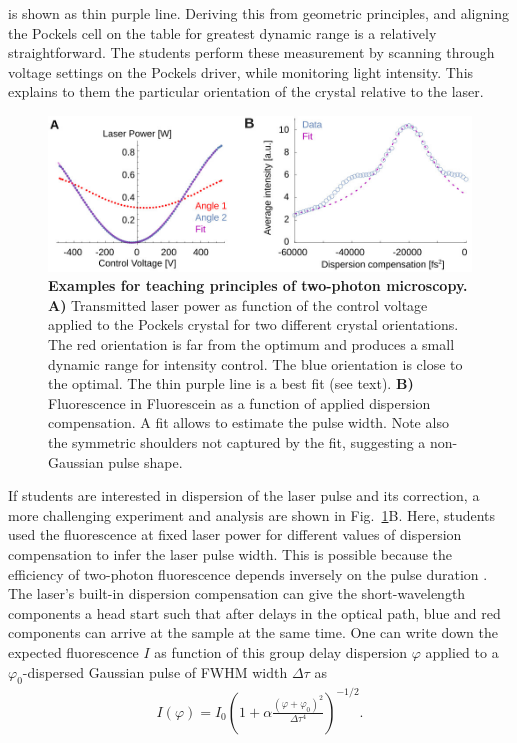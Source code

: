 \documentclass[10pt,letterpaper]{article}
\begin{document}
is shown as thin purple line. Deriving this from geometric principles, and aligning the Pockels cell on the table for greatest dynamic range is a relatively straightforward. The students perform these measurement by scanning through voltage settings on the Pockels driver, while monitoring light intensity. This explains to them the particular orientation of the crystal relative to the laser.\newline
%
\begin{figure}[!t]
    \includegraphics[width=\textwidth]{fig9.jpg}
    \caption{{\bf Examples for teaching principles of two-photon microscopy.} \textbf{A)} Transmitted laser power as function of the control voltage applied to the Pockels crystal for two different crystal orientations. The red orientation is far from the optimum and produces a small dynamic range for intensity control. The blue orientation is close to the optimal. The thin purple line is a best fit (see text). \textbf{B)} Fluorescence in Fluorescein as a function of applied dispersion compensation. A fit allows to estimate the pulse width. Note also the symmetric shoulders not captured by the fit, suggesting a non-Gaussian pulse shape.}
    \label{fig9}
\end{figure}
%
If students are interested in dispersion of the laser pulse and its correction, a more challenging experiment and analysis are shown in Fig.~\ref{fig9}B. Here, students used the fluorescence at fixed laser power for different values of dispersion compensation to infer the laser pulse width. This is possible because the efficiency of two-photon fluorescence depends inversely on the pulse duration \cite{Denk1990}. The laser's built-in dispersion compensation can give the short-wavelength components a head start such that after delays in the optical path, blue and red components can arrive at the sample at the same time. One can write down the expected fluorescence $I$ as function of this group delay dispersion $\varphi$ applied to a $\varphi_0$-dispersed Gaussian pulse of FWHM width $\Delta\tau$ as
\begin{eqnarray}
    I(\varphi) =I_0 \left(1+\alpha\frac{(\varphi+\varphi_0)^2}{\Delta\tau^4}\right)^{-1/2}.
\end{eqnarray}
\end{document}
